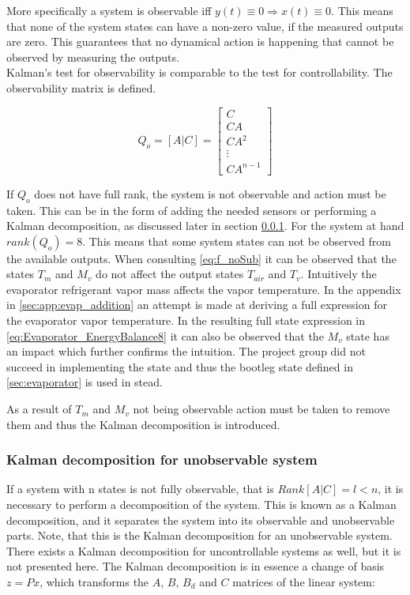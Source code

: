 \noindent More specifically a system is observable iff $y(t) \equiv 0 \Rightarrow x(t) \equiv 0$. This means that none of the system states can have a non-zero value, if the measured outputs are zero. This guarantees that no dynamical action is happening that cannot be observed by measuring the outputs.\\

Kalman's test for observability is comparable to the test for controllability. The observability matrix is defined.

\begin{equation}
	Q_o = [A|C] = \begin{bmatrix}
		C \\ CA \\ CA^2 \\ \vdots \\ CA^{n-1}
	\end{bmatrix}
\end{equation}

If $Q_o$ does not have full rank, the system is not observable and action must be taken. This can be in the form of adding the needed sensors or performing a Kalman decomposition, as discussed later in section \cref{sec:kalman}. For the system at hand $ rank(Q_o) = 8 $. This means that some system states can not be observed from the available outputs. When consulting \cref{eq:f_noSub} it can be observed that the states $T_m$ and $M_v$ do not affect the output states $T_{air}$ and $T_v$. Intuitively the evaporator refrigerant vapor mass affects the vapor temperature. In the appendix in \cref{sec:app:evap_addition} an attempt is made at deriving a full expression for the evaporator vapor temperature. In the resulting full state expression in \cref{eq:Evaporator_EnergyBalance8} it can also be observed that the $M_v$ state has an impact which further confirms the intuition. The project group did not succeed in implementing the state and thus the bootleg state defined in \cref{sec:evaporator} is used in stead.

As a result of $T_m$ and $M_v$ not being observable action must be taken to remove them and thus the Kalman decomposition is introduced.

\subsubsection{Kalman decomposition for unobservable system} \label{sec:kalman}
If a system with n states is not fully observable, that is $Rank[A|C] = l < n$, it is necessary to perform a decomposition of the system. This is known as a Kalman decomposition, and it separates the system into its observable and unobservable parts. Note, that this is the Kalman decomposition for an unobservable system. There exists a Kalman decomposition for uncontrollable systems as well, but it is not presented here. The Kalman decomposition is in essence a change of basis $z=Px$, which transforms the $A$, $B$, $B_d$ and $C$ matrices of the linear system:

